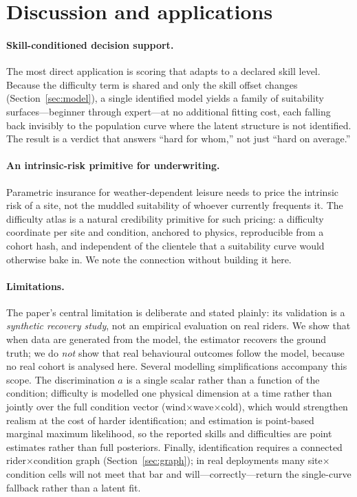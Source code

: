 \section{Discussion and applications}
\label{sec:discussion}

\paragraph{Skill-conditioned decision support.} The most direct application is
scoring that adapts to a declared skill level. Because the difficulty term is
shared and only the skill offset changes (Section~\ref{sec:model}), a single
identified model yields a family of suitability surfaces---beginner through
expert---at no additional fitting cost, each falling back invisibly to the
population curve where the latent structure is not identified. The result is a
verdict that answers ``hard for whom,'' not just ``hard on average.''

\paragraph{An intrinsic-risk primitive for underwriting.} Parametric insurance for
weather-dependent leisure needs to price the intrinsic risk of a site, not the
muddled suitability of whoever currently frequents it. The difficulty atlas is a
natural credibility primitive for such pricing: a difficulty coordinate per site
and condition, anchored to physics, reproducible from a cohort hash, and
independent of the clientele that a suitability curve would otherwise bake in. We
note the connection without building it here.

\paragraph{Limitations.} The paper's central limitation is deliberate and stated
plainly: its validation is a \emph{synthetic recovery study}, not an empirical
evaluation on real riders. We show that when data are generated from the model,
the estimator recovers the ground truth; we do \emph{not} show that real
behavioural outcomes follow the model, because no real cohort is analysed here.
Several modelling simplifications accompany this scope. The discrimination $a$ is
a single scalar rather than a function of the condition; difficulty is modelled
one physical dimension at a time rather than jointly over the full condition
vector (wind${\times}$wave${\times}$cold), which would strengthen realism at the
cost of harder identification; and estimation is point-based marginal maximum
likelihood, so the reported skills and difficulties are point estimates rather
than full posteriors. Finally, identification requires a connected
rider${\times}$condition graph (Section~\ref{sec:graph}); in real deployments many
site${\times}$condition cells will not meet that bar and will---correctly---return
the single-curve fallback rather than a latent fit.


